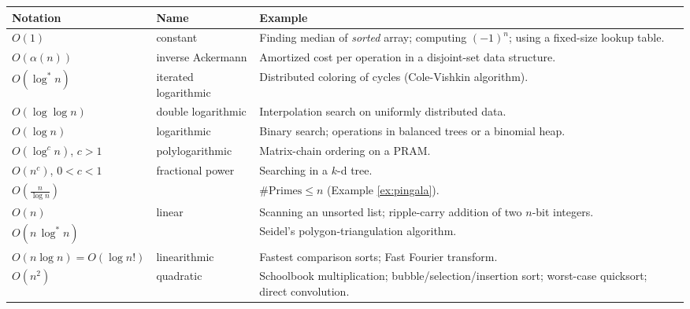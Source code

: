\begin{table}[htb]
    \centering
    \begin{tabularx}{\columnwidth}{%
        |>{\RaggedRight\arraybackslash}p{}%
        |>{\RaggedRight\arraybackslash}p{}%
        |>{\small\RaggedRight\arraybackslash}X| }
      \hline
      \textbf{Notation} 
        & \textbf{Name} 
        & {\normalsize\textbf{Example}} \\
      \hline
      $O(1)$
        & constant
        & Finding median of \emph{sorted} array; computing $(-1)^n$; using a fixed-size lookup table. \\
      \hline
      $O(\alpha(n))$
        & inverse Ackermann
        & Amortized cost per operation in a disjoint-set data structure. \\
      \hline
        $O(\log^* n)$
            & iterated logarithmic
            & Distributed coloring of cycles (Cole-Vishkin algorithm). \\
        \hline
      $O(\log\log n)$
        & double logarithmic
        & Interpolation search on uniformly distributed data. \\
      \hline
      $O(\log n)$
        & logarithmic
        & Binary search; operations in balanced trees or a binomial heap. \\
      \hline
      $O(\log^c n)$, $c>1$
        & polylogarithmic
        & Matrix-chain ordering on a PRAM. \\
      \hline
      $O(n^c)$, $0<c<1$
        & fractional power
        & Searching in a $k$-d tree. \\
      \hline
        $O(\frac{n}{\log n})$
            & & $\#\mathrm{Primes} \leq n$ (Example \ref{ex:pingala}). \\
        \hline
      $O(n)$
        & linear
        & Scanning an unsorted list; ripple-carry addition of two $n$-bit integers. \\
      \hline
      $O(n\,\log^* n)$
        &
        & Seidel's polygon-triangulation algorithm. \\
      \hline
      $O(n\log n)=O(\log n!)$
        & linearithmic
        & Fastest comparison sorts; Fast Fourier transform. \\
      \hline
      $O(n^2)$
        & quadratic
        & Schoolbook multiplication; bubble/selection/insertion sort; worst-case quicksort; direct convolution. \\

\end{tabularx}
\end{table}
